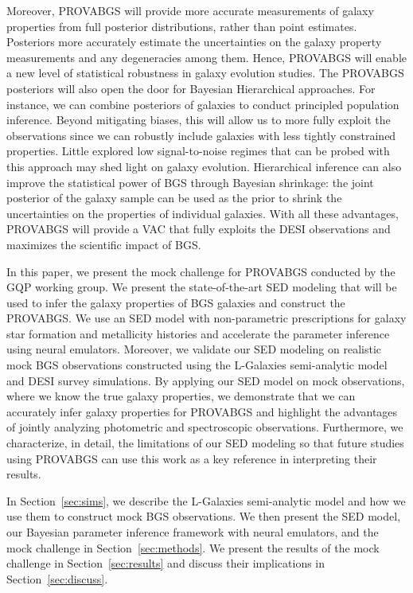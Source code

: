 Moreover, PROVABGS will provide more accurate measurements of galaxy properties
from full posterior distributions, rather than point estimates. 
Posteriors more accurately estimate the uncertainties on the galaxy property
measurements and any degeneracies among them. 
Hence, PROVABGS will enable a new level of statistical robustness in galaxy
evolution studies.
The PROVABGS posteriors will also open the door for Bayesian Hierarchical
approaches.
For instance, we can combine posteriors of galaxies to conduct principled
population inference. 
Beyond mitigating biases, this will allow us to more fully exploit the 
observations since we can robustly include galaxies with less tightly
constrained properties.  
Little explored low signal-to-noise regimes that can be probed with this
approach may shed light on galaxy evolution.
Hierarchical inference can also improve the statistical power of BGS through
Bayesian shrinkage: the joint posterior of the galaxy sample can be used as the
prior to shrink the uncertainties on the properties of individual galaxies. 
With all these advantages, PROVABGS will provide a VAC that fully exploits the
DESI observations and maximizes the scientific impact of BGS. 

In this paper, we present the mock challenge for PROVABGS conducted by the GQP
working group. 
We present the state-of-the-art SED modeling that will be used to infer the
galaxy properties of BGS galaxies and construct the PROVABGS. 
We use an SED model with non-parametric prescriptions for galaxy star formation
and metallicity histories and accelerate the parameter inference using neural
emulators. 
Moreover, we validate our SED modeling on realistic mock BGS observations
constructed using the {\sc L-Galaxies} semi-analytic
model~\citep{henriques2015} and DESI survey simulations. 
By applying our SED model on mock observations, where we know the true galaxy
properties, we demonstrate that we can accurately infer galaxy properties for
PROVABGS and highlight the advantages of jointly analyzing photometric and
spectroscopic observations. 
Furthermore, we characterize, in detail, the limitations of our SED modeling so
that future studies using PROVABGS can use this work as a key reference in
interpreting their results. 

In Section~\ref{sec:sims}, we describe the {\sc L-Galaxies} semi-analytic
model and how we use them to construct mock BGS observations. 
We then present the SED model, our Bayesian parameter inference framework with
neural emulators, and the mock challenge in Section~\ref{sec:methods}. 
We present the results of the mock challenge in Section~\ref{sec:results} and
discuss their implications in Section~\ref{sec:discuss}. 
